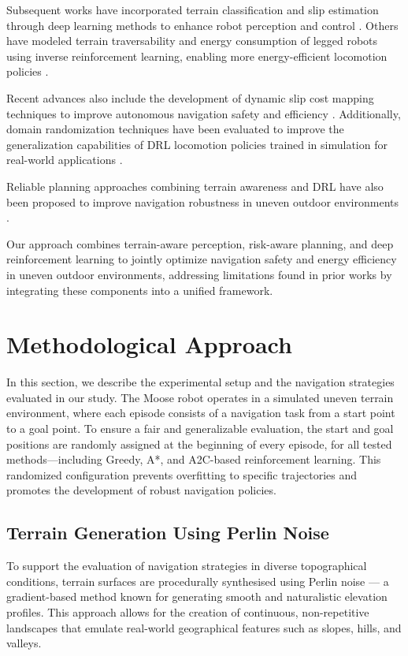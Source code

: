 \documentclass[11pt,twocolumn]{article}
\begin{document}
Subsequent works have incorporated terrain classification and slip estimation through deep learning methods to enhance robot perception and control \cite{gonzalez2018deepterramechanics}. Others have modeled terrain traversability and energy consumption of legged robots using inverse reinforcement learning, enabling more energy-efficient locomotion policies \cite{gan2022energy}.

Recent advances also include the development of dynamic slip cost mapping techniques to improve autonomous navigation safety and efficiency \cite{slipnet2024}. Additionally, domain randomization techniques have been evaluated to improve the generalization capabilities of DRL locomotion policies trained in simulation for real-world applications \cite{mdpi2022randomization}.

Reliable planning approaches combining terrain awareness and DRL have also been proposed to improve navigation robustness in uneven outdoor environments \cite{weerakoon2022terp}.

Our approach combines terrain-aware perception, risk-aware planning, and deep reinforcement learning to jointly optimize navigation safety and energy efficiency in uneven outdoor environments, addressing limitations found in prior works by integrating these components into a unified framework.



\section{Methodological Approach}
In this section, we describe the experimental setup and the navigation strategies evaluated in our study. The Moose robot operates in a simulated uneven terrain environment, where each episode consists of a navigation task from a start point to a goal point. To ensure a fair and generalizable evaluation, the start and goal positions are randomly assigned at the beginning of every episode, for all tested methods—including Greedy, A*, and A2C-based reinforcement learning. This randomized configuration prevents overfitting to specific trajectories and promotes the development of robust navigation policies.

\subsection{Terrain Generation Using Perlin Noise}

To support the evaluation of navigation strategies in diverse topographical conditions, terrain surfaces are procedurally synthesised using Perlin noise — a gradient-based method known for generating smooth and naturalistic elevation profiles. This approach allows for the creation of continuous, non-repetitive landscapes that emulate real-world geographical features such as slopes, hills, and valleys.
\end{document}

